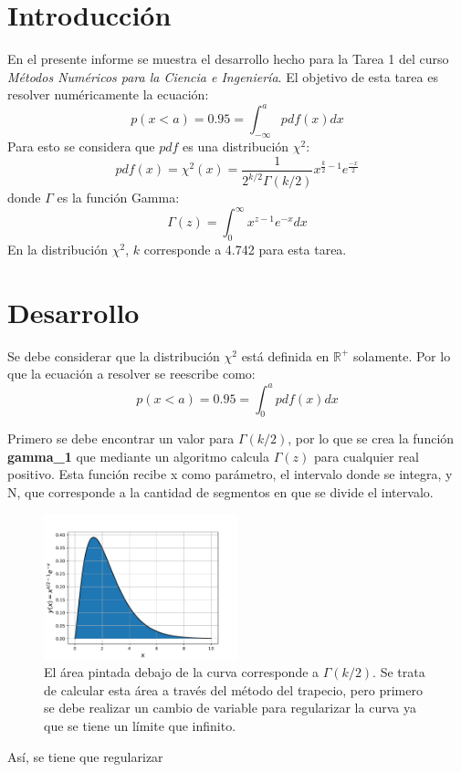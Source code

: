 \documentclass[letterpaper,oneside]{article}
\begin{document}
	
\templatePortrait

\templatePagecfg





\templateFinalcfg

\section{Introducción}
En el presente informe se muestra el desarrollo hecho para la Tarea 1 del curso \textit{Métodos Numéricos para la Ciencia e Ingeniería}. El objetivo de esta tarea es resolver numéricamente la ecuación:
$$ $$
$$ p(x<a)=0.95 = \int^{a}_{-\infty} pdf(x)dx $$
Para esto se considera que $pdf$ es una distribución $\chi^2$:
$$pdf(x)=\chi^2(x)=\frac{1}{2^{k/2} \Gamma(k/2)}x^{\frac{k}{2}-1 }e^{\frac{-x}{2}} $$
donde $\Gamma$ es la función Gamma:
$$\Gamma(z)=\int^{\infty}_0 x^{z-1}e^{-x}dx$$
En la distribución $\chi^2$, $k$ corresponde a 4.742 para esta tarea.

\section{Desarrollo}

Se debe considerar que la distribución $\chi^2$ está definida en $\mathbb{R}^+$ solamente. Por lo que la ecuación a resolver se reescribe como:
$$p(x<a)=0.95 = \int^{a}_{0} pdf(x)dx $$

Primero se debe encontrar un valor para $\Gamma(k/2)$, por lo que se crea la función \textbf{gamma\_1} que mediante un algoritmo calcula $\Gamma(z)$ para cualquier real positivo. Esta función  recibe x como parámetro, el intervalo donde se integra, y N, que corresponde a la cantidad de segmentos en que se divide el intervalo.
\begin{figure}[h]
\includegraphics[width=0.5\textwidth]{gamma sin c.v..pdf}
\caption{El área pintada debajo de la curva corresponde a $\Gamma(k/2)$. Se trata de calcular esta área a través del método del trapecio, pero primero se debe realizar un cambio de variable para regularizar la curva ya que se tiene un límite que infinito.}
    \label{Funcion gamma sin c.v.}
\centering
\end{figure}
Así, se tiene que regularizar
\end{document}
